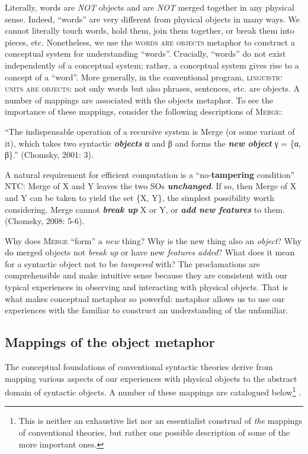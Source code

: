   Literally, words are \textit{NOT} objects and are \textit{NOT} merged together in any physical sense. Indeed, “words” are very different from physical objects in many ways. We cannot literally touch words, hold them, join them together, or break them into pieces, etc. Nonetheless, we use the \textsc{words are objects} metaphor to construct a conceptual system for understanding “words”. Crucially, “words” do not exist independently of a conceptual system; rather, a conceptual system gives rise to a concept of a “word”. More generally, in the conventional program, \textsc{linguistic units are objects}: not only words but also phrases, sentences, etc. are objects. A number of mappings are associated with the objects metaphor. To see the importance of these mappings, consider the following descriptions of \textsc{Merge}: 

“The indispensable operation of a recursive system is Merge (or some variant of it), which takes two syntactic \textbf{\textit{objects}} α and β and forms the \textbf{\textit{new object}} γ = \{α, β\}.” (Chomsky, 2001: 3).

A natural requirement for efficient computation is a “no-\textbf{tampering} condition” NTC: Merge of X and Y leaves the two SOs \textbf{\textit{unchanged}}. If so, then Merge of X and Y can be taken to yield the set \{X, Y\}, the simplest possibility worth considering. Merge cannot \textbf{\textit{break up}} X or Y, or \textbf{\textit{add new features}} to them. (Chomsky, 2008: 5-6).

  Why does \textsc{Merge} “form” a \textit{new} thing? Why is the new thing also an \textit{object}? Why do merged objects not \textit{break up} or have new \textit{features added}? What does it mean for a syntactic object not to be \textit{tampered} with? The proclamations are comprehensible and make intuitive sense because they are consistent with our typical experiences in observing and interacting with physical objects. That is what makes conceptual metaphor so powerful: metaphor allows us to use our experiences with the familiar to construct an understanding of the unfamiliar. 

\subsection{Mappings of the object metaphor}

The conceptual foundations of conventional syntactic theories derive from mapping various aspects of our experiences with physical objects to the abstract domain of syntactic objects. A number of these mappings are catalogued below\footnote{This is neither an exhaustive list nor an essentialist construal of \textit{the} mappings of conventional theories, but rather one possible description of some of the more important ones.} .

